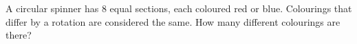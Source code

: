 A circular spinner has $8$ equal sections, each coloured red or blue. Colourings that differ by a rotation are considered the same. How many different colourings are there?
